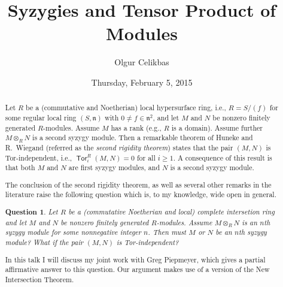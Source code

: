 \documentclass{UAmathtalk}
\author{Olgur Celikbas}
\title{Syzygies and Tensor Product of Modules}
\date{Thursday, February 5, 2015}
\newtheorem*{ques}{Question}
\newcommand*{\Tor}{\operatorname{\mathsf{Tor}}}
\begin{document}
\maketitle

\begin{abstract}
Let $R$ be a (commutative and Noetherian) local hypersurface ring, i.e., $R=S/(f)$ for some regular local ring $(S, \mathfrak{n})$ with $0 \neq f\in \mathfrak{n}^2$, and let $M$ and $N$ be nonzero finitely generated $R$-modules. Assume $M$ has a rank (e.g., $R$ is a domain). Assume further $M\otimes_{R}N$ is a second syzygy module. Then a remarkable theorem of Huneke and R.~Wiegand (referred as the \emph{second rigidity theorem}) states that the pair $(M, N)$ is Tor-independent, i.e., $\Tor_{i}^{R}(M,N)=0$ for all $i\geq 1$. A consequence of this result is that both $M$ and $N$ are first syzygy modules, and $N$ is a second syzygy module.

The conclusion of the second rigidity theorem, as well as several other remarks in the literature raise the following question which is, to my knowledge, wide open in general. 

\begin{ques}
Let $R$ be a (commutative Noetherian and local) complete intersetion ring and let $M$ and $N$ be nonzero finitely generated $R$-modules. Assume $M\otimes_{R}N$ is an $n$th syzygy module for some nonnegative integer $n$. Then must $M$ or $N$ be an $n$th syzygy module? What if the pair $(M, N)$ is Tor-independent?
\end{ques}

In this talk I will discuss my joint work with Greg Piepmeyer, which gives a partial affirmative answer to this question. Our  argument makes use of a version of the New Intersection Theorem.
\end{abstract}
\end{document}
